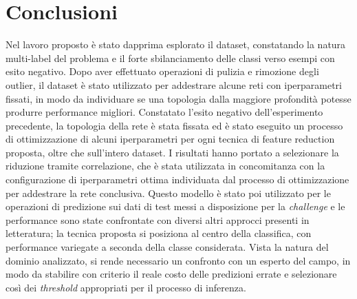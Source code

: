 \section{Conclusioni}
Nel lavoro proposto è stato dapprima esplorato il dataset, constatando la natura multi-label del problema e il forte sbilanciamento delle classi verso esempi con esito negativo. Dopo aver effettuato operazioni di pulizia e rimozione degli outlier, il dataset è stato utilizzato per addestrare alcune reti con iperparametri fissati, in modo da individuare se una topologia dalla maggiore profondità potesse produrre performance migliori. Constatato l'esito negativo dell'esperimento precedente, la topologia della rete è stata fissata ed è stato eseguito un processo di ottimizzazione di alcuni iperparametri per ogni tecnica di feature reduction proposta, oltre che sull'intero dataset. I risultati hanno portato a selezionare la riduzione tramite correlazione, che è stata utilizzata in concomitanza con la configurazione di iperparametri ottima individuata dal processo di ottimizzazione per addestrare la rete conclusiva. Questo modello è stato poi utilizzato per le operazioni di predizione sui dati di test messi a disposizione per la \textit{challenge} e le performance sono state confrontate con diversi altri approcci presenti in letteratura; la tecnica proposta si posiziona al centro della classifica, con performance variegate a seconda della classe considerata. Vista la natura del dominio analizzato, si rende necessario un confronto con un esperto del campo, in modo da stabilire con criterio il reale costo delle predizioni errate e selezionare così dei \textit{threshold} appropriati per il processo di inferenza.